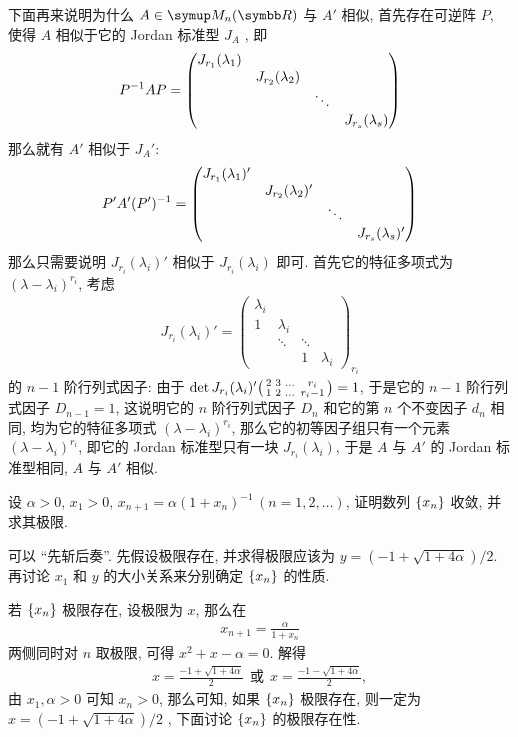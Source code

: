 \begin{exercise}[resume=exer]
\begin{answer}
          下面再来说明为什么 $ A \in \MM $ 与 $ A' $ 相似, 首先存在可逆阵 $ P $, 使得 $ A $ 相似于它的 Jordan 标准型 $ J_{A} $ , 即
          \begin{align*}
              P^{-1}AP = \mqty(\dmat{J_{r_{1}}(\lambda_{1}), J_{r_{2}}(\lambda_{2}), \ddots, J_{r_{s}}(\lambda_{s})})
          \end{align*}
          那么就有 $ A' $ 相似于 $ J_{A}' $:
          \begin{align*}
              P'A'(P')^{-1} = \mqty(\dmat{J_{r_{1}}(\lambda_{1})', J_{r_{2}}(\lambda_{2})', \ddots, J_{r_{s}}(\lambda_{s})'})
          \end{align*}
          那么只需要说明 $ J_{r_{i}}(\lambda_{i})' $ 相似于 $ J_{r_{i}}(\lambda_{i}) $ 即可. 首先它的特征多项式为 $ (\lambda - \lambda_{i})^{r_{i}} $, 考虑
          \begin{align*}
              J_{r_{i}}(\lambda_{i})' = \begin{pmatrix}
                  \lambda_{i} & & & \\
                  1 & \lambda_{i} & & \\
                  &  \ddots & \ddots & \\
                  & & 1 & \lambda_{i}
              \end{pmatrix}_{r_{i}}
          \end{align*}
          的 $ n-1 $ 阶行列式因子: 由于 $ \det J_{r_{i}}(\lambda_{i})'\smqty(2 & 3 & \dots & r_{i} \\ 1 & 2 & \dots & r_{i}-1) = 1 $, 于是它的 $ n - 1 $ 阶行列式因子 $ D_{n-1} = 1 $, 这说明它的 $ n $ 阶行列式因子 $ D_{n} $ 和它的第 $ n $ 个不变因子 $ d_{n} $ 相同, 均为它的特征多项式 $ (\lambda - \lambda_{i})^{r_{i}} $, 那么它的初等因子组只有一个元素 $ (\lambda - \lambda_{i})^{r_{i}} $, 即它的 Jordan 标准型只有一块 $ J_{r_{i}}(\lambda_{i}) $, 于是 $ A $ 与 $ A' $ 的 Jordan 标准型相同, $ A $ 与 $ A' $ 相似.
      \end{answer}
      \item 设 $ \alpha > 0 $, $ x_{1} > 0 $, $ x_{n + 1} = \alpha(1 + x_{n})^{-1}\,(n = 1, 2, \dots) $, 证明数列 $ \qty{x_{n}} $ 收敛, 并求其极限.
      \begin{hint}
          可以 ``先斩后奏''. 先假设极限存在, 并求得极限应该为 $ y = (-1 + \sqrt{1 + 4\alpha})/2 $. 再讨论 $ x_{1} $ 和 $ y $ 的大小关系来分别确定 $ \qty{x_{n}} $ 的性质.
      \end{hint}
  \begin{answer}
      若 $ \qty{x_{n}} $ 极限存在, 设极限为 $ x $, 那么在
      \begin{align*}
          x_{n + 1} = \frac{\alpha}{1 + x_{n}}
      \end{align*}
      两侧同时对 $ n $ 取极限, 可得 $ x^{2} + x - \alpha = 0 $. 解得
      \begin{align*}
          x = \frac{-1 + \sqrt{1 + 4\alpha}}{2} \ \ \text{或}\ \  x = \frac{-1 - \sqrt{1 + 4\alpha}}{2},
      \end{align*}
      由 $ x_{1}, \alpha > 0 $ 可知 $ x_{n} > 0 $, 那么可知, 如果 $ \qty{x_{n}} $ 极限存在, 则一定为 $ x = (-1 + \sqrt{1 + 4\alpha})/2 $ , 下面讨论 $ \qty{x_{n}} $ 的极限存在性.


\end{answer}
\end{exercise}
